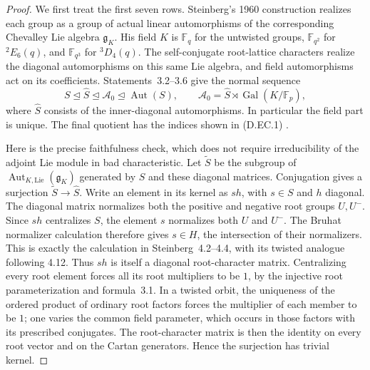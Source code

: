 \begin{proof}
We first treat the first seven rows. Steinberg's 1960
construction realizes each group as a group of actual
linear automorphisms of the corresponding Chevalley Lie
algebra $\mathfrak g_K$. His field $K$ is $\mathbb F_q$
for the untwisted groups, $\mathbb F_{q^2}$ for ${}^2E_6(q)$,
and $\mathbb F_{q^3}$ for ${}^3D_4(q)$. The self-conjugate
root-lattice characters realize the diagonal automorphisms
on this same Lie algebra, and field automorphisms act on
its coefficients. Statements~3.2--3.6 give the normal
sequence
\[
 S\mathrel{\trianglelefteq}\widehat S
   \mathrel{\trianglelefteq}\mathcal A_0
   \mathrel{\trianglelefteq}\operatorname{Aut}(S),
 \qquad \mathcal A_0=\widehat S\rtimes
                  \operatorname{Gal}(K/\mathbb F_p),           \tag{D.EC.4}
\]
where $\widehat S$ consists of the inner-diagonal
automorphisms. In particular the field part is unique.
The final quotient has the indices shown in (D.EC.1)
\citep[Section~2, statements~3.2--3.6, and their complete
written proofs in Sections~4--7]{Steinberg1960ClassicalAutomorphismsB}.

Here is the precise faithfulness check, which does not
require irreducibility of the adjoint Lie module in bad
characteristic. Let $\widetilde S$ be the subgroup of
$\operatorname{Aut}_{K,\mathrm{Lie}}(\mathfrak g_K)$
generated by $S$ and these diagonal matrices. Conjugation
gives a surjection $\widetilde S\to\widehat S$.
Write an element in its kernel as $s h$, with $s\in S$
and $h$ diagonal. The diagonal matrix normalizes both
the positive and negative root groups $U,U^-$.
Since $s h$ centralizes $S$, the element $s$ normalizes
both $U$ and $U^-$. The Bruhat normalizer calculation
therefore gives $s\in H$, the intersection of their
normalizers. This is exactly the calculation in
Steinberg~4.2--4.4, with its twisted analogue following
4.12. Thus $s h$ is itself a diagonal root-character
matrix. Centralizing every root element forces all
its root multipliers to be $1$, by the injective root
parameterization and formula~3.1. In a twisted orbit,
the uniqueness of the ordered product of ordinary root
factors forces the multiplier of each member to be $1$;
one varies the common field parameter, which occurs in
those factors with its prescribed conjugates. The
root-character matrix is then the identity on every
root vector and on the Cartan generators. Hence the
surjection has trivial kernel.


\end{proof}
